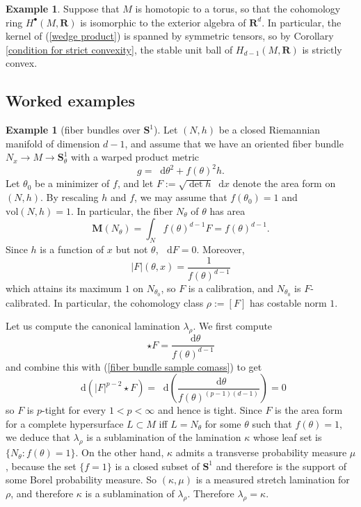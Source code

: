 \documentclass[reqno,11pt]{amsart}
\newcommand{\RR}{\mathbf{R}}
\newcommand{\Sph}{\mathbf S}
\newcommand*\dif{\mathop{}\!\mathrm{d}}
\newcommand{\vol}{\mathrm{vol}}
\newcommand{\Mass}{\mathbf M}
\theoremstyle{definition}
\newtheorem{example}[theorem]{Example}
\numberwithin{equation}{section}
\begin{document}
\begin{example}\label{torus convex}
Suppose that $M$ is homotopic to a torus, so that the cohomology ring $H^\bullet(M, \RR)$ is isomorphic to the exterior algebra of $\RR^d$.
In particular, the kernel of (\ref{wedge product}) is spanned by symmetric tensors, so by Corollary \ref{condition for strict convexity}, the stable unit ball of $H_{d - 1}(M, \RR)$ is strictly convex.
\end{example}

\subsection{Worked examples}
\begin{example}[fiber bundles over $\Sph^1$]\label{fiber bundle}
Let $(N, h)$ be a closed Riemannian manifold of dimension $d - 1$, and assume that we have an oriented fiber bundle $N_x \to M \to \Sph^1_\theta$ with a warped product metric 
$$g = \dif \theta^2 + f(\theta)^2 h.$$
Let $\theta_0$ be a minimizer of $f$, and let $F := \sqrt{\det h} \dif x$ denote the area form on $(N, h)$.
By rescaling $h$ and $f$, we may assume that $f(\theta_0) = 1$ and $\vol(N, h) = 1$.
In particular, the fiber $N_\theta$ of $\theta$ has area
$$\Mass(N_\theta) = \int_N f(\theta)^{d - 1} F = f(\theta)^{d - 1}.$$
Since $h$ is a function of $x$ but not $\theta$, $\dif F = 0$.
Moreover,
\begin{equation}\label{fiber bundle sample comass}
|F|(\theta, x) = \frac{1}{f(\theta)^{d - 1}}
\end{equation}
which attains its maximum $1$ on $N_{\theta_0}$, so $F$ is a calibration, and $N_{\theta_0}$ is $F$-calibrated.
In particular, the cohomology class $\rho := [F]$ has costable norm $1$.

Let us compute the canonical lamination $\lambda_\rho$.
We first compute
$$\star F = \frac{\dif \theta}{f(\theta)^{d - 1}}$$
and combine this with (\ref{fiber bundle sample comass}) to get
$$\dif(|F|^{p - 2} \star F) = \dif\left(\frac{\dif \theta}{f(\theta)^{(p - 1)(d - 1)}}\right) = 0$$
so $F$ is $p$-tight for every $1 < p < \infty$ and hence is tight.
Since $F$ is the area form for a complete hypersurface $L \subset M$ iff $L = N_\theta$ for some $\theta$ such that $f(\theta) = 1$, we deduce that $\lambda_\rho$ is a sublamination of the lamination $\kappa$ whose leaf set is $\{N_\theta: f(\theta) = 1\}$.
On the other hand, $\kappa$ admits a transverse probability measure $\mu$, because the set $\{f = 1\}$ is a closed subset of $\Sph^1$ and therefore is the support of some Borel probability measure.
So $(\kappa, \mu)$ is a measured stretch lamination for $\rho$, and therefore $\kappa$ is a sublamination of $\lambda_\rho$.
Therefore $\lambda_\rho = \kappa$.


\end{example}
\end{document}
